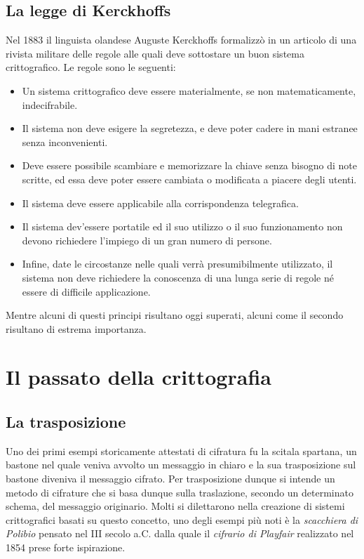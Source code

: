 \documentclass[a4paper, 12pt]{article}
\begin{document}
\subsection{La legge di Kerckhoffs}
Nel 1883 il linguista olandese Auguste Kerckhoffs formalizzò in un articolo di una rivista militare delle regole alle quali deve sottostare un buon sistema crittografico. Le regole sono le seguenti:
\begin{itemize}
	\item Un sistema crittografico deve essere materialmente, se non matematicamente, indecifrabile.
	\item Il sistema non deve esigere la segretezza, e deve poter cadere in mani estranee senza inconvenienti.
	\item Deve essere possibile scambiare e memorizzare la chiave senza bisogno di note scritte, ed essa deve poter essere cambiata o modificata a piacere degli utenti.
	\item Il sistema deve essere applicabile alla corrispondenza telegrafica.
	\item Il sistema dev'essere portatile ed il suo utilizzo o il suo funzionamento non devono richiedere l'impiego di un gran numero di persone.
	\item Infine, date le circostanze nelle quali verrà presumibilmente utilizzato, il sistema non deve richiedere la conoscenza di una lunga serie di regole né essere di difficile applicazione.
\end{itemize}
Mentre alcuni di questi principi risultano oggi superati, alcuni come il secondo risultano di estrema importanza.
\section{Il passato della crittografia}
\subsection{La trasposizione}
Uno dei primi esempi storicamente attestati di cifratura fu la scitala spartana, un bastone nel quale veniva avvolto un messaggio in chiaro e la sua trasposizione sul bastone diveniva il messaggio cifrato. Per trasposizione dunque si intende un metodo di cifrature che si basa dunque sulla traslazione, secondo un determinato schema, del messaggio originario.\newline
Molti si dilettarono nella creazione di sistemi crittografici basati su questo concetto, uno degli esempi più noti è la \textit{scacchiera di Polibio} pensato nel III secolo a.C. dalla quale il \textit{cifrario di Playfair} realizzato nel 1854 prese forte ispirazione.
\end{document}
